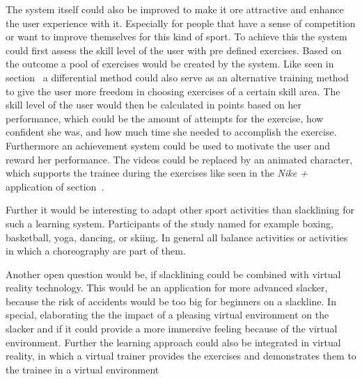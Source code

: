 The system itself could also be improved to make it ore attractive and enhance the user experience with it.
Especially for people that have a sense of competition or want to improve themselves for this kind of sport. 
To achieve this the system could first assess the skill level of the user with pre defined exercises.
Based on the outcome a pool of exercises would be created by the system.
Like seen in section~\textit{} a differential method could also serve as an alternative training method to give the user more freedom in choosing exercises of a certain skill area.
The skill level of the user would then be calculated in points based on her performance, which could be the amount of attempts for the exercise, how confident she was, and how much time she needed to accomplish the exercise.
Furthermore an achievement system could be used to motivate the user and reward her performance.
The videos could be replaced by an animated character, which supports the trainee during the exercises like seen in the \textit{Nike +} application of section~\textit{}.

Further it would be interesting to adapt other sport activities than slacklining for such a learning system.
Participants of the study named for example boxing, basketball, yoga, dancing, or skiing.
In general all balance activities or activities in which a choreography are part of them.

Another open question would be, if slacklining could be combined with virtual reality technology.
This would be an application for more advanced slacker, because the risk of accidents would be too big for beginners on a slackline.
In special, elaborating the the impact of a pleasing virtual environment on the slacker and if it could provide a more immersive feeling because of the virtual environment.
Further the learning approach could also be integrated in virtual reality, in which a virtual trainer provides the exercises and demonstrates them to the trainee in a virtual environment

% 


